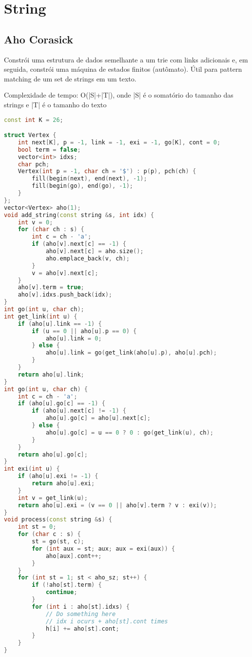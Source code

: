 \documentclass[11pt, a4paper, oneside]{book}
\begin{document}
\hfill

\newpage

%
%
%
%

\chapter{String}

\section{Aho Corasick}


Constrói uma estrutura de dados semelhante a um trie com links adicionais e, em seguida, constrói uma máquina de estados finitos (autômato). Útil para pattern matching de um set de strings em um texto.



Complexidade de tempo: O(|S|+|T|), onde |S| é o somatório do tamanho das strings e |T| é o tamanho do texto

\hfill

\begin{multicols}{2}
\begin{lstlisting}[language=C++]
const int K = 26;

struct Vertex {
    int next[K], p = -1, link = -1, exi = -1, go[K], cont = 0;
    bool term = false;
    vector<int> idxs;
    char pch;
    Vertex(int p = -1, char ch = '$') : p(p), pch(ch) {
        fill(begin(next), end(next), -1);
        fill(begin(go), end(go), -1);
    }
};
vector<Vertex> aho(1);
void add_string(const string &s, int idx) {
    int v = 0;
    for (char ch : s) {
        int c = ch - 'a';
        if (aho[v].next[c] == -1) {
            aho[v].next[c] = aho.size();
            aho.emplace_back(v, ch);
        }
        v = aho[v].next[c];
    }
    aho[v].term = true;
    aho[v].idxs.push_back(idx);
}
int go(int u, char ch);
int get_link(int u) {
    if (aho[u].link == -1) {
        if (u == 0 || aho[u].p == 0) {
            aho[u].link = 0;
        } else {
            aho[u].link = go(get_link(aho[u].p), aho[u].pch);
        }
    }
    return aho[u].link;
}
int go(int u, char ch) {
    int c = ch - 'a';
    if (aho[u].go[c] == -1) {
        if (aho[u].next[c] != -1) {
            aho[u].go[c] = aho[u].next[c];
        } else {
            aho[u].go[c] = u == 0 ? 0 : go(get_link(u), ch);
        }
    }
    return aho[u].go[c];
}
int exi(int u) {
    if (aho[u].exi != -1) {
        return aho[u].exi;
    }
    int v = get_link(u);
    return aho[u].exi = (v == 0 || aho[v].term ? v : exi(v));
}
void process(const string &s) {
    int st = 0;
    for (char c : s) {
        st = go(st, c);
        for (int aux = st; aux; aux = exi(aux)) {
            aho[aux].cont++;
        }
    }
    for (int st = 1; st < aho_sz; st++) {
        if (!aho[st].term) {
            continue;
        }
        for (int i : aho[st].idxs) {
            // Do something here
            // idx i ocurs + aho[st].cont times
            h[i] += aho[st].cont;
        }
    }
}
\end{lstlisting}
\end{multicols}
\end{document}
